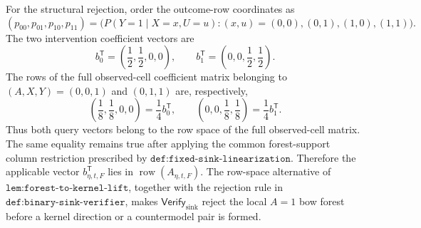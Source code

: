 For the structural rejection, order the outcome-row coordinates as
\[
 (p_{00},p_{01},p_{10},p_{11})
 =\bigl(P(Y=1\mid X=x,U=u): (x,u)=(0,0),(0,1),(1,0),(1,1)\bigr).
\]
The two intervention coefficient vectors are
\[
 b_0^{\mathsf T}=\left(\frac12,\frac12,0,0\right),
 \qquad
 b_1^{\mathsf T}=\left(0,0,\frac12,\frac12\right).
\]
The rows of the full observed-cell coefficient matrix belonging to \((A,X,Y)=(0,0,1)\) and \((0,1,1)\) are, respectively,
\[
 \left(\frac18,\frac18,0,0\right)=\frac14 b_0^{\mathsf T},
 \qquad
 \left(0,0,\frac18,\frac18\right)=\frac14 b_1^{\mathsf T}.
\]
Thus both query vectors belong to the row space of the full observed-cell matrix.  The same equality remains true after applying the common forest-support column restriction prescribed by \(\texttt{def:fixed-sink-linearization}\).  Therefore the applicable vector \(b_{\eta,t,F}^{\mathsf T}\) lies in \(\operatorname{row}(A_{\eta,t,F})\).  The row-space alternative of \(\texttt{lem:forest-to-kernel-lift}\), together with the rejection rule in \(\texttt{def:binary-sink-verifier}\), makes \(\mathsf{Verify}_{\mathrm{sink}}\) reject the local \(A=1\) bow forest before a kernel direction or a countermodel pair is formed.
